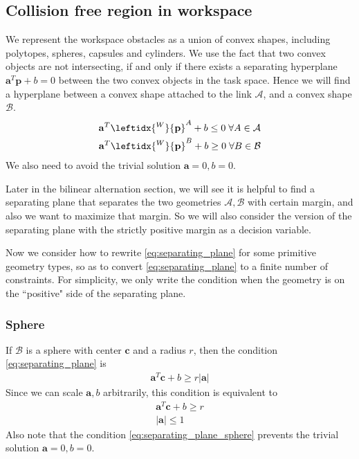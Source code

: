 \documentclass{article}
\renewcommand{\vec}[1]{\mathbf{#1}}
\begin{document}
\subsection{Collision free region in workspace}
\label{subsection:collision_free_region}
We represent the workspace obstacles as a union of convex shapes, including polytopes, spheres, capsules and cylinders. We use the fact that two convex objects are not intersecting, if and only if there exists a separating hyperplane $\vec{a}^T\vec{p}+b=0$ between the two convex objects in the task space. Hence we will find a hyperplane between a convex shape attached to the link $\mathcal{A}$, and a convex shape $\mathcal{B}$.
\begin{subequations}
\begin{align}
	\vec{a}^T\leftidx{^W}{\vec{p}}^{A} + b \le 0 \;\forall A\in\mathcal{A}\\
	\vec{a}^T\leftidx{^W}{\vec{p}}^{B} + b \ge 0 \;\forall B\in\mathcal{B}
\end{align}
\label{eq:separating_plane}
\end{subequations}
We also need to avoid the trivial solution $\vec{a}=0, b=0$.

Later in the bilinear alternation section, we will see it is helpful to find a separating plane that separates the two geometries $\mathcal{A},\mathcal{B}$ with certain margin, and also we want to maximize that margin. So we will also consider the version of the separating plane with the strictly positive margin as a decision variable.

Now we consider how to rewrite \eqref{eq:separating_plane} for some primitive geometry types, so as to convert \eqref{eq:separating_plane} to a finite number of constraints. For simplicity, we only write the condition when the geometry is on the ``positive" side of the separating plane.
\subsubsection{Sphere}
If $\mathcal{B}$ is a sphere with center $\vec{c}$ and a radius $r$, then the condition \eqref{eq:separating_plane} is
\begin{align}
	\vec{a}^T \vec{c} + b \ge r |\vec{a}|
\end{align}
Since we can scale $\vec{a}, b$ arbitrarily, this condition is equivalent to
\begin{subequations}
\begin{align}
	\vec{a}^T\vec{c} + b \ge r\\
	|\vec{a}|\le 1
\end{align}
\label{eq:separating_plane_sphere}
\end{subequations}
Also note that the condition \eqref{eq:separating_plane_sphere} prevents the trivial solution $\vec{a}=0, b=0$.
\end{document}

